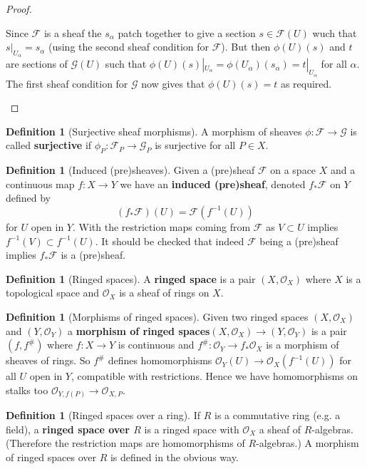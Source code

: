 \documentclass[10pt,]{book}
\newcommand{\terminology}[1]{\textbf{#1}}
\theoremstyle{plain}
\theoremstyle{definition}
\newtheorem{definition}[theorem]{Definition}
\newcommand{\F}{\mathcal{F}}
\newcommand{\G}{\mathcal{G}}
\newcommand{\cO}{\mathcal{O}}
\begin{document}
\begin{proof}
\begin{enumerate}
                  Since \(\F\) is a sheaf the \(s_\alpha\) patch together to give a section \(s \in \F(U)\) wuch that \(s|_{U_\alpha} = s_\alpha\) (using the second sheaf condition for \(\F\)).
                  But then \(\phi(U)(s)\) and \(t\) are sections of \(\G(U)\) such that \(\phi(U)(s)|_{U_{\alpha}}  = \phi(U_\alpha)(s_\alpha) = t|_{U_\alpha}\) for all \(\alpha\).
                  The first sheaf condition for \(\G\) now gives that \(\phi(U)(s) = t\) as required.
                \end{enumerate}

\end{proof}
\begin{definition}[Surjective sheaf morphisms]\label{definition-6}
A morphism of sheaves \(\phi\colon \F \to \G\) is called \terminology{surjective} if \(\phi_P\colon \F_P\to\G_P \) is surjective for all \(P \in X\).\end{definition}
\begin{definition}[Induced (pre)sheaves]\label{definition-7}
Given a (pre)sheaf \(\F\) on a space \(X\) and a continuous map \(f\colon X \to Y\) we have an \terminology{induced (pre)sheaf}, denoted \(f_*\F\) on \(Y\) defined by
            \[(f_*\F)(U) = \F(f^{-1}(U))\]
            for \(U\) open in \(Y\).
            With the restriction maps coming from \(\F\) as \(V \subset U\) implies \(f^{-1}(V)\subset f^{-1}(U)\).
            It should be checked that indeed \(\F\) being a (pre)sheaf implies \(f_*\F\) is a (pre)sheaf.
          \end{definition}
\begin{definition}[Ringed spaces]\label{definition-8}
A \terminology{ringed space} is a pair \((X,\cO_X)\) where \(X\) is a topological space and \(\cO_X\) is a sheaf of rings on \(X\).\end{definition}
\begin{definition}[Morphisms of ringed spaces]\label{definition-9}
Given two ringed spaces \((X,\cO_X)\) and \((Y, \cO_Y)\) a \terminology{morphism of ringed spaces}\((X,\cO_X)\to (Y,\cO_Y)\) is a pair \((f,f^\#)\) where \(f\colon X \to Y\) is continuous and \(f^\#\colon \cO_Y \to f_*\cO_X\) is a morphism of sheaves of rings.
            So \(f^\#\) defines homomorphisms \(\cO_Y(U) \to \cO_X(f^{-1}(U))\) for all \(U\) open in \(Y\), compatible with restrictions.
            Hence we have homomorphisms on stalks too \(\cO_{Y,f(P)} \to \cO_{X,P}\).
          \end{definition}
\begin{definition}[Ringed spaces over a ring]\label{definition-10}
If \(R\) is a commutative ring (e.g. a field), a \terminology{ringed space over \(R\)} is a ringed space with \(\cO_X\) a sheaf of \(R\)-algebras.
            (Therefore the restriction maps are homomorphisms of \(R\)-algebras.)
            A morphism of ringed spaces over \(R\) is defined in the obvious way.
          \end{definition}
\end{document}
